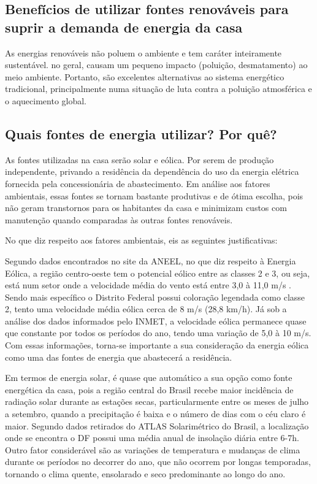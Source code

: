 \subsection{Benefícios de utilizar fontes renováveis para suprir a demanda de energia da casa}

	As energias renováveis não poluem o ambiente e tem caráter inteiramente sustentável. no geral, causam um pequeno impacto (poluição, desmatamento) ao meio ambiente. Portanto, são excelentes alternativas ao sistema energético tradicional, principalmente numa situação de luta contra a poluição atmosférica e o aquecimento global.

\subsection{Quais fontes de energia utilizar? Por quê?}

	As fontes utilizadas na casa serão solar e eólica. Por serem de produção independente, privando a residência da dependência do uso da energia elétrica fornecida pela concessionária de abastecimento. Em análise aos fatores ambientais, essas fontes se tornam bastante produtivas e de ótima escolha, pois não geram transtornos para os habitantes da casa e minimizam custos com manutenção quando comparadas às outras fontes renováveis.\cite{brasilescolafontesrenovaveis}

	No que diz respeito aos fatores ambientais, eis as seguintes justificativas:

	Segundo dados encontrados no site da ANEEL, no que diz respeito à Energia Eólica, a região centro-oeste tem o potencial eólico entre as classes 2 e 3, ou seja, está num setor onde a velocidade média do vento está entre 3,0 à 11,0 m/s \cite{americadosolperguntasfrequentes}. Sendo mais específico o Distrito Federal possui coloração legendada como classe 2, tento uma velocidade média eólica cerca de 8 m/s (28,8 km/h). Já sob a análise dos dados informados pelo INMET, a velocidade eólica permanece quase que constante por todos os períodos do ano, tendo uma variação de 5,0 à 10 m/s. Com essas informações, torna-se importante a sua consideração da energia eólica como uma das fontes de energia que abastecerá a residência.\cite{atlaseolico}


	Em termos de energia solar, é quase que automático a sua opção como fonte energética da casa, pois a região central do Brasil recebe maior incidência de radiação solar durante as estações secas, particularmente entre os meses de julho a setembro, quando a precipitação é baixa e o número de dias com o céu claro é maior\cite{portalsolar}. Segundo dados retirados do ATLAS Solarimétrico do Brasil\cite{ufpe2000}, a localização onde se encontra o DF possui uma média anual de insolação diária entre 6-7h. Outro fator considerável são as variações de temperatura e mudanças de clima durante os períodos no decorrer do ano, que não ocorrem por longas temporadas, tornando o clima quente, ensolarado e seco predominante ao longo do ano.
	
